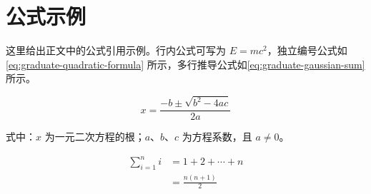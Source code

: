 \section{公式示例}
这里给出正文中的公式引用示例。行内公式可写为 $E=mc^2$，独立编号公式如\autoref{eq:graduate-quadratic-formula} 所示，多行推导公式如\autoref{eq:graduate-gaussian-sum} 所示。

\begin{equation}
    x = \frac{-b \pm \sqrt{b^2 - 4ac}}{2a}
    \label{eq:graduate-quadratic-formula}
\end{equation}
\begin{eqvariables}
    式中：$x$ 为一元二次方程的根；$a$、$b$、$c$ 为方程系数，且 $a \neq 0$。
\end{eqvariables}

\begin{equation}
    \begin{aligned}
        \sum_{i=1}^{n} i &= 1 + 2 + \cdots + n \\
                         &= \frac{n(n+1)}{2}
    \end{aligned}
    \label{eq:graduate-gaussian-sum}
\end{equation}
